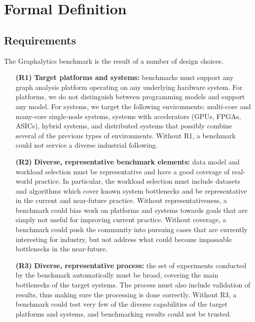 \chapter{Formal Definition}
\label{chap:definition}

\section{Requirements}
\label{sec:requirements}
The Graphalytics benchmark is the result of a number of design choices.

\begin{itemize}
\item[\textbf{(R1)}] \textbf{Target platforms and systems:} benchmarks must support any graph analysis platform operating on any underlying hardware system. For platforms, we do not distinguish between programming models and support any model. For systems, we target the following environments: 
multi-core and many-core single-node systems, systems with accelerators (GPUs, FPGAs, ASICs), hybrid systems, and distributed systems that possibly combine several of the previous types of environments.
Without R1, a benchmark could not service a diverse industrial following.

\item[\textbf{(R2)}] \textbf{Diverse, representative benchmark elements:} data model and workload selection must be representative and have a good coverage of real-world practice. In particular, the workload selection must include datasets and algorithms which cover known system bottlenecks and be representative in the current and near-future practice. Without representativeness, a benchmark could bias work on platforms and systems towards goals that are simply not useful for improving current practice. Without coverage, a benchmark could push the community into pursuing cases that are currently interesting for industry, but not address what could become impassable bottlenecks in the near-future.

\item[\textbf{(R3)}] \textbf{Diverse, representative process:} the set of experiments conducted by the benchmark automatically must be broad, covering the main bottlenecks of the target systems.  The process must also include validation of results, thus making sure the processing is done correctly. Without R3, a benchmark could test very few of the diverse capabilities of the target platforms and systems, and benchmarking results could not be trusted.


\end{itemize}
